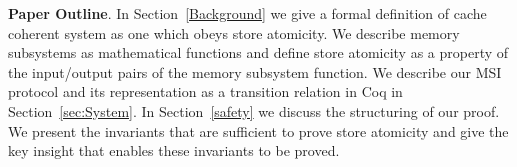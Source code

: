 
\noindent\textbf{Paper Outline}. In Section~\ref{Background} we give a
formal definition of cache coherent system as one which obeys store atomicity.
We describe memory subsystems as mathematical functions and define store
atomicity as a property of the input/output pairs of the memory subsystem
function. We describe our MSI protocol and its representation as a
transition relation in Coq in Section~\ref{sec:System}. In
Section~\ref{safety} we discuss the structuring of our proof. We
present the invariants that are sufficient to prove store atomicity and give
the key insight that enables these invariants to be proved.
